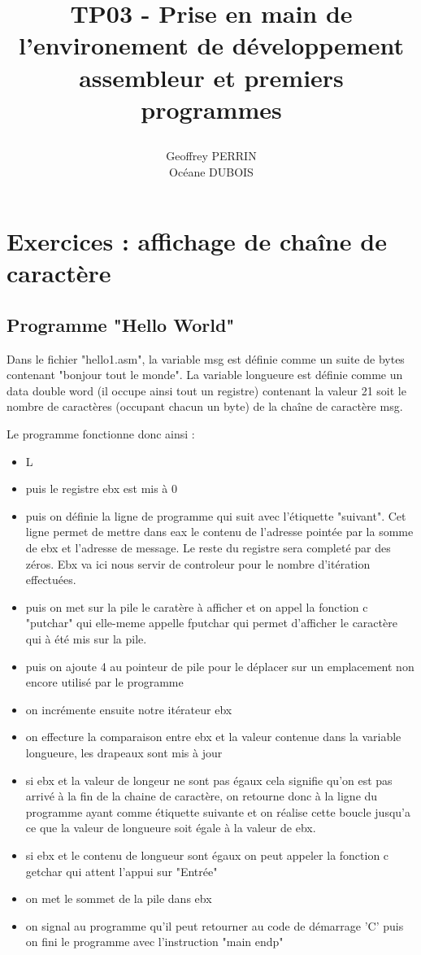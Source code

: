 \documentclass[11pt]{report}
\title{\textbf{TP03 - Prise en main de l'environement de développement assembleur et premiers programmes }
\author{Geoffrey PERRIN \\ Océane DUBOIS\\}
\date{}}
\begin{document}
\maketitle

\newpage

\section{Exercices : affichage de chaîne de caractère}

\subsection{Programme "Hello World"}

Dans le fichier "hello1.asm", la variable msg est définie comme un suite de bytes contenant "bonjour tout le monde".
La variable longueure est définie comme un data double word (il occupe ainsi tout un registre) contenant la valeur 21 soit le nombre de caractères (occupant chacun un byte) de la chaîne de caractère msg.

Le programme fonctionne donc ainsi :
\begin{itemize}
\item L
\item puis le registre ebx est mis à 0
\item puis on définie la ligne de programme qui suit avec l'étiquette "suivant". Cet ligne permet de mettre dans eax le contenu de l'adresse pointée par la somme de ebx et l'adresse de message. Le reste du registre sera completé par des zéros. Ebx va ici nous servir de controleur pour le nombre d'itération effectuées.
\item puis on met sur la pile le caratère à afficher et on appel la fonction c "putchar" qui elle-meme appelle fputchar qui permet d'afficher le caractère qui à été mis sur la pile.
\item puis on ajoute 4 au pointeur de pile pour le déplacer sur un emplacement non encore utilisé par le programme
\item on incrémente ensuite notre itérateur ebx
\item on effecture la comparaison entre ebx et la valeur contenue dans la variable longueure, les drapeaux sont mis à jour
\item si ebx et la valeur de longeur ne sont pas égaux cela signifie qu'on est pas arrivé à la fin de la chaine de caractère, on retourne donc à la ligne du programme ayant comme étiquette suivante et on réalise cette boucle jusqu'a ce que la valeur de longueure soit égale à la valeur de ebx.
\item si ebx et le contenu de longueur sont égaux on peut appeler la fonction c getchar qui attent l'appui sur "Entrée"
\item on met le sommet de la pile dans ebx
\item on signal au programme qu'il peut retourner au code de démarrage 'C' puis on fini le programme avec l'instruction "main endp"

\end{itemize}
\end{document}
